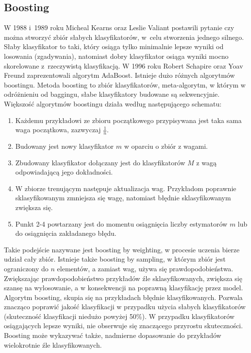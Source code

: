\subsection{Boosting}
W 1988 i 1989 roku Micheal Kearns oraz Leslie Valiant postawili pytanie czy można stworzyć zbiór słabych klasyfikatorów, w celu stworzenia jednego silnego. Słaby klasyfikator to taki, który osiąga tylko minimalnie lepsze wyniki od losowania (zgadywania), natomiast dobry klasyfikator osiąga wyniki mocno skorelowane z rzeczywistą klasyfikacją. W 1996 roku Robert Schapire oraz Yoav Freund zaprezentowali algorytm AdaBoost. Istnieje dużo różnych algorytmów boostingu. 
Metoda boosting to zbiór klasyfikatorów, meta-algorytm, w którym w odróżnieniu od baggingu, słabe klasyfikatory budowane są sekwencyjnie. Większość algorytmów boostingu działa według następującego schematu:
\begin{enumerate}
	\item Każdemu przykładowi ze zbioru początkowego przypisywana jest taka sama waga początkowa, zazwyczaj $\frac{1}{n}$.
	\item Budowany jest nowy klasyfikator $m$ w oparciu o zbiór z wagami.
	\item Zbudowany klasyfikator dołączany jest do klasyfikatorów $M$ z wagą odpowiadającą jego dokładności.
	\item W zbiorze trenującym następuje aktualizacja wag. Przykładom poprawnie sklasyfikowanym zmniejsza się wagę, natomiast  błędnie sklasyfikowanym zwiększa się.
	\item Punkt 2-4 powtarzany jest do momentu osiągnięcia liczby estymatorów $m$ lub do osiągnięcia zakładanego błędu. 
\end{enumerate}
Takie podejście nazywane jest boosting by weighting, w procesie uczenia bierze udział cały zbiór. Istnieje także boosting by sampling, w którym zbiór jest ograniczony do $n$ elementów, a zamiast wag, używa się prawdopodobieństwa. Zwiększając prawdopodobieństwo przykładów źle sklasyfikowanych, zwiększa się szansę na wylosowanie, a w konsekwencji na poprawną klasyfikację przez model. \\
Algorytm boosting, skupia się na przykładach błędnie klasyfikowanych. Pozwala znacząco poprawić jakość klasyfikacji w przypadku użycia słabych klasyfikatorów (skuteczność klasyfikacji niedużo powyżej 50\%). W przypadku klasyfikatorów osiągających lepsze wyniki, nie obserwuje się znaczącego przyrostu skuteczności. Boosting może wykazywać także, nadmierne dopasowanie do przykładów wielokrotnie źle klasyfikowanych. \\
